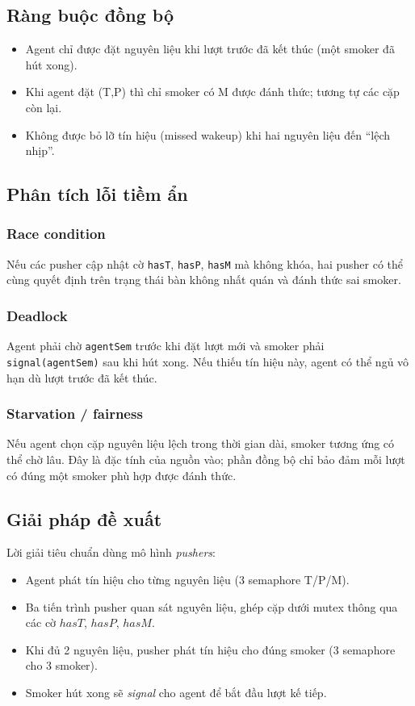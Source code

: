 \subsection{Ràng buộc đồng bộ}
\begin{itemize}
    \item Agent chỉ được đặt nguyên liệu khi lượt trước đã kết thúc (một smoker đã hút xong).
    \item Khi agent đặt (T,P) thì chỉ smoker có M được đánh thức; tương tự các cặp còn lại.
    \item Không được bỏ lỡ tín hiệu (missed wakeup) khi hai nguyên liệu đến “lệch nhịp”.
\end{itemize}

\subsection{Phân tích lỗi tiềm ẩn}

\subsubsection*{Race condition}
Nếu các pusher cập nhật cờ \texttt{hasT}, \texttt{hasP}, \texttt{hasM} mà
không khóa, hai pusher có thể cùng quyết định trên trạng thái bàn không nhất
quán và đánh thức sai smoker.

\subsubsection*{Deadlock}
Agent phải chờ \texttt{agentSem} trước khi đặt lượt mới và smoker phải
\texttt{signal(agentSem)} sau khi hút xong. Nếu thiếu tín hiệu này, agent có
thể ngủ vô hạn dù lượt trước đã kết thúc.

\subsubsection*{Starvation / fairness}
Nếu agent chọn cặp nguyên liệu lệch trong thời gian dài, smoker tương ứng có
thể chờ lâu. Đây là đặc tính của nguồn vào; phần đồng bộ chỉ bảo đảm mỗi lượt
có đúng một smoker phù hợp được đánh thức.

\subsection{Giải pháp đề xuất}
Lời giải tiêu chuẩn dùng mô hình \textit{pushers}:
\begin{itemize}
    \item Agent phát tín hiệu cho từng nguyên liệu (3 semaphore T/P/M).
    \item Ba tiến trình pusher quan sát nguyên liệu, ghép cặp dưới mutex thông qua các cờ $hasT$, $hasP$, $hasM$.
    \item Khi đủ 2 nguyên liệu, pusher phát tín hiệu cho đúng smoker (3 semaphore cho 3 smoker).
    \item Smoker hút xong sẽ \textit{signal} cho agent để bắt đầu lượt kế tiếp.
\end{itemize}

